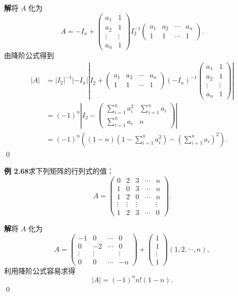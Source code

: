 \documentclass[UTF8,12pt,a4paper,fontset=fandol]{ctexart}
\begin{document}
\noindent\textbf{解}\quad 将 $A$ 化为
\[
A=-I_n+
\left(
\begin{array}{cc}
a_1 & 1\\
a_2 & 1\\
\vdots & \vdots\\
a_n & 1
\end{array}
\right)
I_2^{-1}
\left(
\begin{array}{cccc}
a_1 & a_2 & \cdots & a_n\\
1 & 1 & \cdots & 1
\end{array}
\right).
\]
由降阶公式得到
\[
\begin{aligned}
|A|
&=|I_2|^{-1}|-I_n|
\left|
I_2+
\left(
\begin{array}{cccc}
a_1 & a_2 & \cdots & a_n\\
1 & 1 & \cdots & 1
\end{array}
\right)
(-I_n)^{-1}
\left(
\begin{array}{cc}
a_1 & 1\\
a_2 & 1\\
\vdots & \vdots\\
a_n & 1
\end{array}
\right)
\right|\\
&=(-1)^n
\left|
I_2-
\left(
\begin{array}{cc}
\sum\limits_{i=1}^n a_i^2 & \sum\limits_{i=1}^n a_i\\
\sum\limits_{i=1}^n a_i & n
\end{array}
\right)
\right|\\
&=(-1)^n\left((1-n)\left(1-\sum_{i=1}^n a_i^2\right)-\left(\sum_{i=1}^n a_i\right)^2\right).
\end{aligned}
\]
\qed

\noindent\textbf{例 2.68}\quad 求下列矩阵的行列式的值：
\[
A=
\left(
\begin{array}{ccccc}
0 & 2 & 3 & \cdots & n\\
1 & 0 & 3 & \cdots & n\\
1 & 2 & 0 & \cdots & n\\
\vdots & \vdots & \vdots & & \vdots\\
1 & 2 & 3 & \cdots & 0
\end{array}
\right).
\]

\noindent\textbf{解}\quad 将 $A$ 化为
\[
A=
\left(
\begin{array}{cccc}
-1 & 0 & \cdots & 0\\
0 & -2 & \cdots & 0\\
\vdots & \vdots & & \vdots\\
0 & 0 & \cdots & -n
\end{array}
\right)
+
\left(
\begin{array}{c}
1\\
1\\
\vdots\\
1
\end{array}
\right)
(1,2,\cdots,n),
\]
利用降阶公式容易求得
\[
|A|=(-1)^n n!(1-n).
\]
\qed
\end{document}
